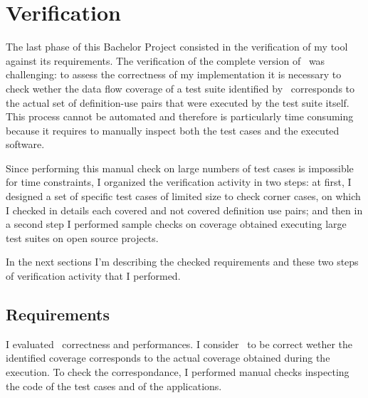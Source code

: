 \section{Verification}\label{validation}

The last phase of this Bachelor Project consisted in the verification of my tool against its requirements. 
The verification of the complete version of \datec~was challenging: to assess the correctness of my implementation it is necessary to check wether the data flow coverage of a test suite identified by \datec~corresponds to the actual set of definition-use pairs that were executed by the test suite itself. This process cannot be automated and therefore is particularly time consuming because it requires to manually inspect both the test cases and the executed software. 

Since performing this manual check on large numbers of test cases is impossible for time constraints, I organized the verification activity in two steps: at first, I designed a set of specific test cases of limited size to check corner cases, on which I checked in details each covered and not covered definition use pairs; and then in a second step I performed sample checks on coverage obtained executing large test suites on open source projects. 

In the next sections I'm describing the checked requirements and these two steps of verification activity that I performed. 



\subsection{Requirements}
I evaluated \datec~correctness and performances. I consider \datec~to be correct wether the identified coverage corresponds to the actual coverage obtained during the execution. To check the correspondance, I performed manual checks inspecting the code of the test cases and of the applications. 

